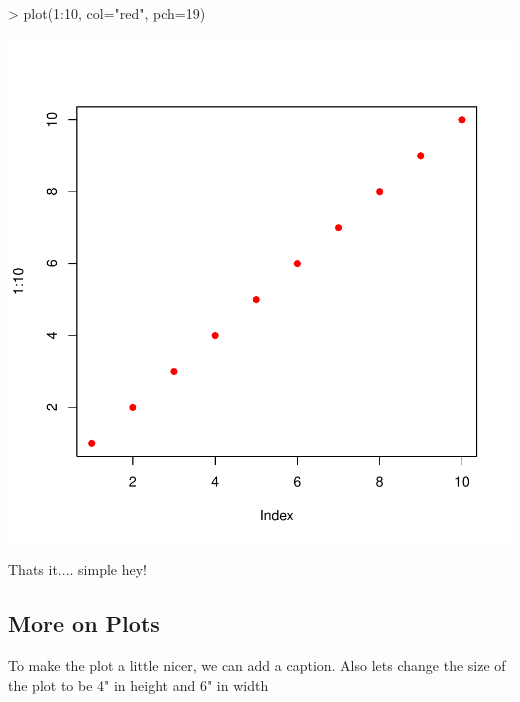 \documentclass{article}
\begin{document}
\begin{Schunk}
\begin{Sinput}
> plot(1:10, col="red", pch=19)
\end{Sinput}
\end{Schunk}
\includegraphics{Fig-test2}

Thats it.... simple hey!


\subsection{More on Plots}

To make the plot a little nicer, we can add a caption. Also lets change the size of the plot to be 4" in height and 6" in width
\end{document}
